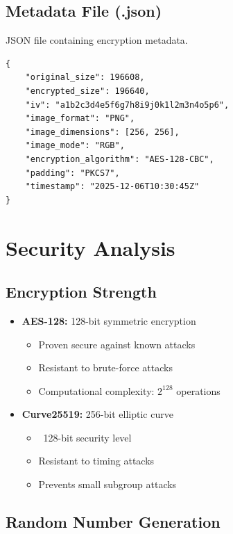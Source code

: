 \documentclass[12pt,a4paper]{report}
\begin{document}
\subsection{Metadata File (.json)}

JSON file containing encryption metadata.

\begin{lstlisting}[caption=Example metadata.json]
{
    "original_size": 196608,
    "encrypted_size": 196640,
    "iv": "a1b2c3d4e5f6g7h8i9j0k1l2m3n4o5p6",
    "image_format": "PNG",
    "image_dimensions": [256, 256],
    "image_mode": "RGB",
    "encryption_algorithm": "AES-128-CBC",
    "padding": "PKCS7",
    "timestamp": "2025-12-06T10:30:45Z"
}
\end{lstlisting}

\section{Security Analysis}

\subsection{Encryption Strength}

\begin{itemize}
    \item \textbf{AES-128:} 128-bit symmetric encryption
    \begin{itemize}
        \item Proven secure against known attacks
        \item Resistant to brute-force attacks
        \item Computational complexity: $2^{128}$ operations
    \end{itemize}
    
    \item \textbf{Curve25519:} 256-bit elliptic curve
    \begin{itemize}
        \item ~128-bit security level
        \item Resistant to timing attacks
        \item Prevents small subgroup attacks
    \end{itemize}
\end{itemize}

\subsection{Random Number Generation}
\end{document}
